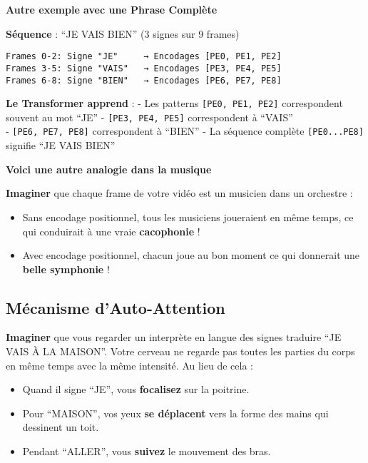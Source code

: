 \documentclass[12pt]{article}
\providecommand{\tightlist}{%
      \setlength{\itemsep}{0pt}\setlength{\parskip}{0pt}}
\begin{document}
    \textbf{Autre exemple avec une Phrase Complète}

\textbf{Séquence} : ``JE VAIS BIEN'' (3 signes sur 9 frames)

\begin{verbatim}
Frames 0-2: Signe "JE"     → Encodages [PE0, PE1, PE2]
Frames 3-5: Signe "VAIS"   → Encodages [PE3, PE4, PE5]  
Frames 6-8: Signe "BIEN"   → Encodages [PE6, PE7, PE8]
\end{verbatim}

\textbf{Le Transformer apprend} : - Les patterns
\texttt{{[}PE0,\ PE1,\ PE2{]}} correspondent souvent au mot ``JE'' -
\texttt{{[}PE3,\ PE4,\ PE5{]}} correspondent à ``VAIS''\\
- \texttt{{[}PE6,\ PE7,\ PE8{]}} correspondent à ``BIEN'' - La séquence
complète \texttt{{[}PE0...PE8{]}} signifie ``JE VAIS BIEN''

\textbf{Voici une autre analogie dans la musique}

\textbf{Imaginer} que chaque frame de votre vidéo est un musicien dans
un orchestre :

\begin{itemize}
\tightlist
\item
  Sans encodage positionnel, tous les musiciens joueraient en même
  temps, ce qui conduirait à une vraie \textbf{cacophonie} !\\
\item
  Avec encodage positionnel, chacun joue au bon moment ce qui donnerait
  une \textbf{belle symphonie} !
\end{itemize}

    \subsection{Mécanisme
d'Auto-Attention}\label{muxe9canisme-dauto-attention}

\textbf{Imaginer} que vous regarder un interprète en langue des signes
traduire ``JE VAIS À LA MAISON''. Votre cerveau ne regarde pas toutes
les parties du corps en même temps avec la même intensité. Au lieu de
cela :

\begin{itemize}
\tightlist
\item
  Quand il signe ``JE'', vous \textbf{focalisez} sur la poitrine.
\item
  Pour ``MAISON'', vos yeux \textbf{se déplacent} vers la forme des
  mains qui dessinent un toit.
\item
  Pendant ``ALLER'', vous \textbf{suivez} le mouvement des bras.
\end{itemize}
\end{document}

